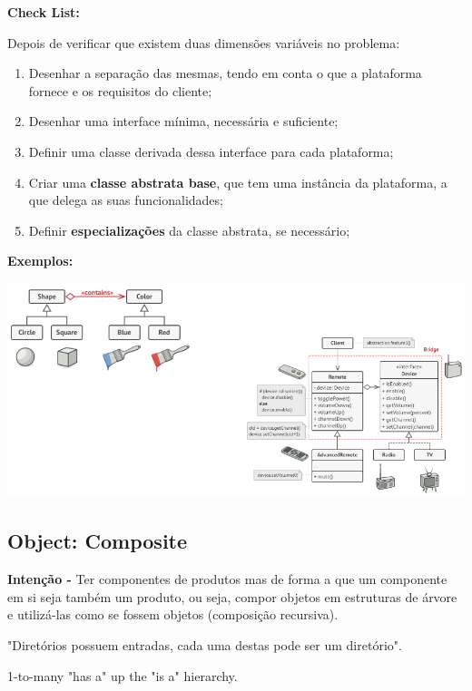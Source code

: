 \documentclass{article}
\begin{document}
\begin{flushleft}
    \textbf{Check List:}

    \vspace{3mm}
    Depois de verificar que existem duas dimensões variáveis no problema:
    \begin{enumerate}
        \item Desenhar a separação das mesmas, tendo em conta o que a plataforma
        fornece e os requisitos do cliente;
        \item Desenhar uma interface mínima, necessária e suficiente;
        \item Definir uma classe derivada dessa interface para cada plataforma;
        \item Criar uma \textbf{classe abstrata base}, que tem uma instância da plataforma, a
        que delega as suas funcionalidades;
        \item Definir \textbf{especializações} da classe abstrata, se necessário;
    \end{enumerate}
\end{flushleft}

\pagebreak

\begin{flushleft}
    \textbf{Exemplos:}

    \begin{center}
        \includegraphics[scale=0.5]{Images/44.png}
    \end{center}
\end{flushleft}

\subsection{Object: Composite}

\begin{flushleft}
    \textbf{Intenção -} Ter componentes de produtos mas de forma a que um componente em si seja
    também um produto, ou seja, compor objetos em estruturas de árvore e utilizá-las
    como se fossem objetos (composição recursiva).

    "Diretórios possuem entradas, cada uma destas pode ser um diretório".

    1-to-many "has a" up the "is a" hierarchy.
\end{flushleft}
\end{document}
